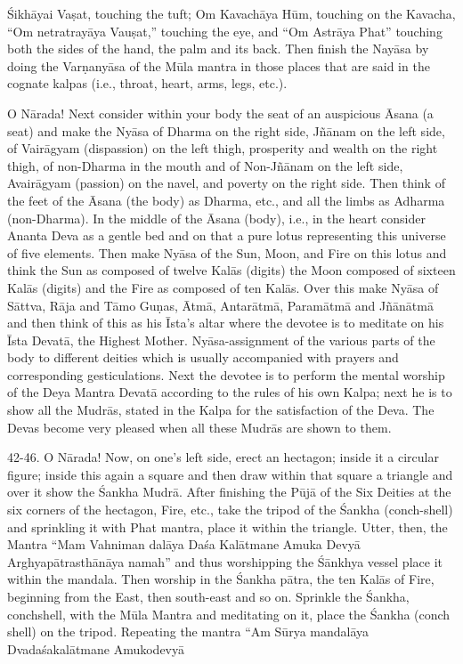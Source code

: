 \'Sikh\=ayai Va\d{s}at, touching the tuft; Om Kavach\=aya H\=um, touching on the Kavacha, ``Om netratray\=aya Vau\d{s}at,'' touching the eye, and ``Om Astr\=aya Phat'' touching both the sides of the hand, the palm and its back. Then finish the Nay\=asa by doing the Var\d{n}any\=asa of the M\=ula mantra in those places that are said in the cognate kalpas (i.e., throat, heart, arms, legs, etc.).

O N\=arada! Next consider within your body the seat of an auspicious \=Asana (a seat) and make the Ny\=asa of Dharma on the right side, J\~n\=anam on the left side, of Vair\=agyam (dispassion) on the left thigh, prosperity and wealth on the right thigh, of non-Dharma in the mouth and of Non-J\~n\=anam on the left side, Avair\=agyam (passion) on the navel, and poverty on the right side. Then think of the feet of the \=Asana (the body) as Dharma, etc., and all the limbs as Adharma (non-Dharma). In the middle of the \=Asana (body), i.e., in the heart consider Ananta Deva as a gentle bed and on that a pure lotus representing this universe of five elements. Then make Ny\=asa of the Sun, Moon, and Fire on this lotus and think the Sun as composed of twelve Kal\=as (digits) the Moon composed of sixteen Kal\=as (digits) and the Fire as composed of ten Kal\=as. Over this make Ny\=asa of S\=attva, R\=aja and T\=amo Gu\d{n}as, \=Atm\=a, Antar\=atm\=a, Param\=atm\=a and J\~n\=an\=atm\=a and then think of this as his \=Ista's altar where the devotee is to meditate on his \=Ista Devat\=a, the Highest Mother. Ny\=asa-assignment of the various parts of the body to different deities which is usually accompanied with prayers and corresponding gesticulations. Next the devotee is to perform the mental worship of the Deya Mantra Devat\=a according to the rules of his own Kalpa; next he is to show all the Mudr\=as, stated in the Kalpa for the satisfaction of the Deva. The Devas become very pleased when all these Mudr\=as are shown to them.

42-46. O N\=arada! Now, on one's left side, erect an hectagon; inside it a circular figure; inside this again a square and then draw within that square a triangle and over it show the \'Sankha Mudr\=a. After finishing the P\=uj\=a of the Six Deities at the six corners of the hectagon, Fire, etc., take the tripod of the \'Sankha (conch-shell) and sprinkling it with Phat mantra, place it within the triangle. Utter, then, the Mantra ``Mam Vahniman dal\=aya Da\'sa Kal\=atmane Amuka Devy\=a Arghyap\=atrasth\=an\=aya namah'' and thus worshipping the \'S\=ankhya vessel place it within the mandala. Then worship in the \'Sankha p\=atra, the ten Kal\=as of Fire, beginning from the East, then south-east and so on. Sprinkle the \'Sankha, conchshell, with the M\=ula Mantra and meditating on it, place the \'Sankha (conch shell) on the tripod. Repeating the mantra ``Am S\=urya mandal\=aya Dvada\'sakal\=atmane Amukodevy\=a

